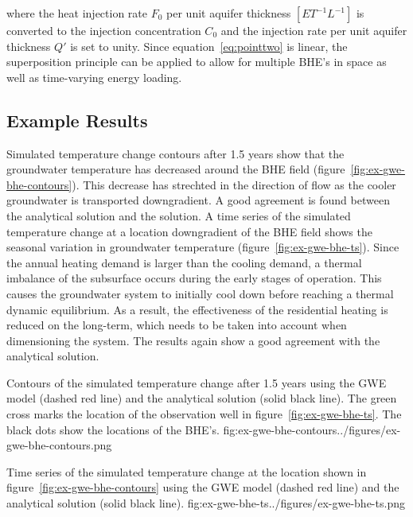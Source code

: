 where the heat injection rate $F_0$ per unit aquifer thickness $[ET^{-1}L^{-1}]$ is converted to the injection concentration $C_0$ and the injection rate per unit aquifer thickness $Q'$ is set to unity. Since equation~\ref{eq:pointtwo} is linear, the superposition principle can be applied to allow for multiple BHE's in space as well as time-varying energy loading.

\subsection{Example Results}

Simulated temperature change contours after 1.5 years show that the groundwater temperature has decreased around the BHE field (figure~\ref{fig:ex-gwe-bhe-contours}). This decrease has strechted in the direction of flow as the cooler groundwater is transported downgradient. A good agreement is found between the analytical solution and the \mf solution. A time series of the simulated temperature change at a location downgradient of the BHE field shows the seasonal variation in groundwater temperature (figure~\ref{fig:ex-gwe-bhe-ts}). Since the annual heating demand is larger than the cooling demand, a thermal imbalance of the subsurface occurs during the early stages of operation. This causes the groundwater system to initially cool down before reaching a thermal dynamic equilibrium. As a result, the effectiveness of the residential heating is reduced on the long-term, which needs to be taken into account when dimensioning the system. The \mf results again show a good agreement with the analytical solution.

\begin{StandardFigure}{
    Contours of the simulated temperature change after 1.5 years using the \mf GWE model (dashed red line) and the analytical solution (solid black line). The green cross marks the location of the observation well in figure~\ref{fig:ex-gwe-bhe-ts}. The black dots show the locations of the BHE's.
    }{fig:ex-gwe-bhe-contours}{../figures/ex-gwe-bhe-contours.png}
\end{StandardFigure}                                 

\begin{StandardFigure}{
    Time series of the simulated temperature change at the location shown in figure~\ref{fig:ex-gwe-bhe-contours} using the \mf GWE model (dashed red line) and the analytical solution (solid black line). 
    }{fig:ex-gwe-bhe-ts}{../figures/ex-gwe-bhe-ts.png}
\end{StandardFigure}    
